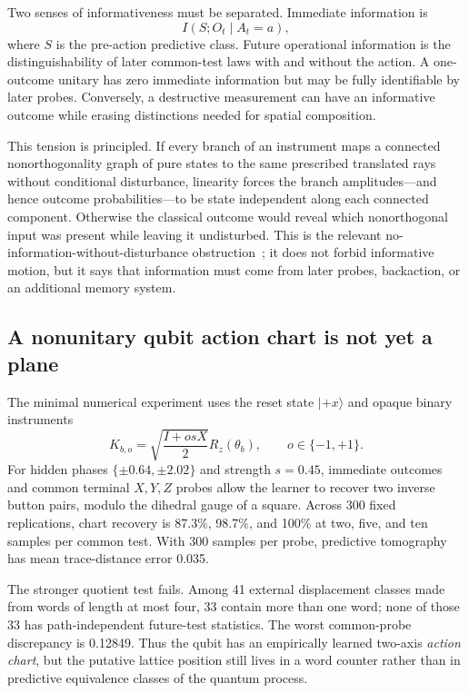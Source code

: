 \documentclass[11pt]{article}
\begin{document}
Two senses of informativeness must be separated. Immediate information is
\begin{equation}
 I(S;O_t\mid A_t=a),
\end{equation}
where $S$ is the pre-action predictive class. Future operational information
is the distinguishability of later common-test laws with and without the
action. A one-outcome unitary has zero immediate information but may be fully
identifiable by later probes. Conversely, a destructive measurement can have
an informative outcome while erasing distinctions needed for spatial
composition.

This tension is principled. If every branch of an instrument maps a connected
nonorthogonality graph of pure states to the same prescribed translated rays
without conditional disturbance, linearity forces the branch amplitudes---and
hence outcome probabilities---to be state independent along each connected
component. Otherwise the classical outcome would reveal which nonorthogonal
input was present while leaving it undisturbed. This is the relevant
no-information-without-disturbance obstruction~\cite{fuchs1996,busch2009}; it
does not forbid informative motion, but it says that information must come
from later probes, backaction, or an additional memory system.

\subsection{A nonunitary qubit action chart is not yet a plane}

The minimal numerical experiment uses the reset state $|+x\rangle$ and opaque
binary instruments
\begin{equation}
 K_{b,o}=\sqrt{\frac{I+osX}{2}}R_z(\theta_b),
 \qquad o\in\{-1,+1\}.
\end{equation}
For hidden phases $\{\pm0.64,\pm2.02\}$ and strength $s=0.45$, immediate
outcomes and common terminal $X,Y,Z$ probes allow the learner to recover two
inverse button pairs, modulo the dihedral gauge of a square. Across 300 fixed
replications, chart recovery is 87.3\%, 98.7\%, and 100\% at two, five, and ten
samples per common test. With 300 samples per probe, predictive tomography has
mean trace-distance error 0.035.

The stronger quotient test fails. Among 41 external displacement classes made
from words of length at most four, 33 contain more than one word; none of those
33 has path-independent future-test statistics. The worst common-probe
discrepancy is 0.12849. Thus the qubit has an empirically learned two-axis
\emph{action chart}, but the putative lattice position still lives in a word
counter rather than in predictive equivalence classes of the quantum process.
\end{document}
